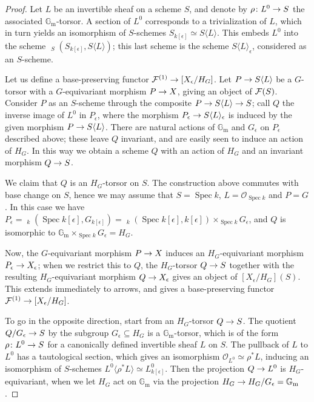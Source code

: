 \documentclass{amsart}
\numberwithin{equation}{section}
\numberwithin{subsection}{section}
\theoremstyle{definition}
\theoremstyle{remark}
\newcommand\cO{\mathcal{O}} \newcommand\cP{\mathcal{P}}
\newcommand\arr{\ifinner\to\else\longrightarrow\fi}
\newcommand\spec{\operatorname{Spec}}
\newcommand\generate[1]{\langle #1 \rangle}
\newcommand{\underhom}
{\mathop{\underline{\mathrm{Hom}}}\nolimits}
\newcommand{\gm}{\mathbb{G}_{\mathrm{m}}}
\begin{document}
\begin{proof}



Let $L$ be an invertible sheaf on a scheme $S$, and denote by $\rho\colon L^{0} \arr S$ the associated $\gm$-torsor. A section of $L^{0}$ corresponds to a trivialization of $L$, which in turn yields an isomorphism of $S$-schemes $S_{k[\epsilon]} \simeq S\generate{L}$. This embeds $L^{0}$ into the scheme $\underhom_{S}(S_{k[\epsilon]}, S\generate{L})$; this last scheme is the scheme $S\generate{L}_{\epsilon}$, considered as an $S$-scheme.

Let us define a base-preserving functor $\cF^{(1)} \arr [X_{\epsilon}/H_G]$. Let $P\arr S\generate{L}$ be a $G$-torsor with a $G$-equivariant morphism $P \arr X$, giving an object of $\mathcal{F}(S)$. Consider $P$ as an $S$-scheme through the composite $P \arr S\generate{L} \arr S$; call $Q$ the inverse image of $L^{0}$ in $P_{\epsilon}$, where the morphism $P_{\epsilon} \arr S\generate{L}_{\epsilon}$ is induced by the given morphism $P \arr S\generate{L}$. There are natural actions of $\gm$ and $G_{\epsilon}$ on $P_{\epsilon}$ described above; these leave $Q$ invariant, and are easily seen to induce an action of $H_G$. In this way we obtain a scheme $Q$ with an action of $H_G$ and an invariant morphism $Q \arr S$.

We claim that $Q$ is an $H_G$-torsor on $S$. The construction above commutes with base change on $S$, hence we may assume that $S = \spec k$, $L = \cO_{\spec k}$ and $P = G$. In this case we have $P_{\epsilon} = \underhom_{k}(\spec k[\epsilon], G_{k[\epsilon]}) = \underhom_{k}(\spec k[\epsilon], k[\epsilon])\times_{\spec k}G_{\epsilon}$, and $Q$ is isomorphic to $\gm \times_{\spec k} G_{\epsilon} = H_G$.

Now, the $G$-equivariant morphism $P \arr X$ induces an $H_G$-equivariant morphism $P_{\epsilon} \arr X_{\epsilon}$; when we restrict this to $Q$, the $H_G$-torsor $Q \arr S$ together with the resulting $H_G$-equivariant morphism $Q \arr X_{\epsilon}$ gives an object of $[X_{\epsilon}/H_G](S)$. This extends immediately to arrows, and gives a base-preserving functor $\cF^{(1)} \arr [X_{\epsilon}/H_G]$.

To go in the opposite direction, start from an $H_G$-torsor $Q \arr S$. The quotient $Q/G_{\epsilon} \arr S$ by the subgroup $G_{\epsilon} \subseteq H_G$ is a $\gm$-torsor, which is of the form $\rho\colon L^{0} \arr S$ for a canonically defined invertible sheaf $L$ on $S$. The pullback of $L$ to $L^{0}$ has a tautological section, which gives an isomorphism $\cO_{L^{0}} \simeq \rho^{*}L$, inducing an isomorphism of $S$-schemes $L^{0}\generate{\rho^{*}L} \simeq L^{0}_{k[\epsilon]}$. Then the projection $Q \arr L^{0}$ is $H_G$-equivariant, when we let $H_G$ act on $\gm$ via the projection $H_G \arr H_G/G_{\epsilon} = \gm$.


\end{proof}
\end{document}
